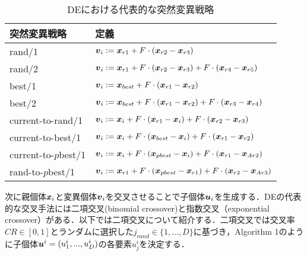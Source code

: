 \documentclass[a4paper,11pt,oneside,openany]{jsbook}
\def\vector#1{\mbox{\boldmath $#1$}}
\begin{document}
\begin{table}[htb]
  \begin{center}
  \caption{DEにおける代表的な突然変異戦略}
    \begin{tabular}{ll} \hline
      突然変異戦略　& 定義  \\ \hline
      rand/1 & $\vector{v}_{i} := \vector{x}_{r1} + F\cdot(\vector{x}_{r2} - \vector{x}_{r3})$ \\
      rand/2 & $\vector{v}_{i} := \vector{x}_{r1} + F\cdot(\vector{x}_{r2} - \vector{x}_{r3}) + F\cdot(\vector{x}_{r4} - \vector{x}_{r5})$ \\
      best/1 & $\vector{v}_{i} := \vector{x}_{best} + F\cdot(\vector{x}_{r1} - \vector{x}_{r2})$ \\
      best/2 & $\vector{v}_{i} := \vector{x}_{best} + F\cdot(\vector{x}_{r1} - \vector{x}_{r2}) + F\cdot(\vector{x}_{r3} - \vector{x}_{r4})$ \\
      current-to-rand/1 & $\vector{v}_{i} := \vector{x}_{i} + F\cdot(\vector{x}_{r1} - \vector{x}_{i}) + F\cdot(\vector{x}_{r2} - \vector{x}_{r3})$ \\
      current-to-best/1 & $\vector{v}_{i} := \vector{x}_{i} + F\cdot(\vector{x}_{best} - \vector{x}_{i}) + F\cdot(\vector{x}_{r1} - \vector{x}_{r2})$ \\
      current-to-$p$best/1 & $\vector{v}_{i} := \vector{x}_{i} + F\cdot(\vector{x}_{pbest} - \vector{x}_{i}) + F\cdot(\vector{x}_{r1} - \vector{x}_{Ar2})$ \\
      rand-to-$p$best/1 & $\vector{v}_{i} := \vector{x}_{r1} + F\cdot(\vector{x}_{pbest} - \vector{x}_{r1}) + F\cdot(\vector{x}_{r2} - \vector{x}_{Ar3})$ \\ \hline
    \end{tabular}
  \end{center}
\end{table}


次に親個体$\vector{x}_i$と変異個体$\vector{v}_i$を交叉させることで子個体$\vector{u}_i$を生成する．DEの代表的な交叉手法には二項交叉(binomial crossover)と指数交叉（exponential crossover）がある．以下では二項交叉について紹介する．二項交叉では交叉率$CR \in [0,1]$とランダムに選択した$j_{rand} \in \{1,...,D\}$に基づき，Algorithm 1のように子個体$\vector{u}^i = (u^i_1,...,u^i_D)$の各要素$u^i_j$を決定する．
\end{document}
